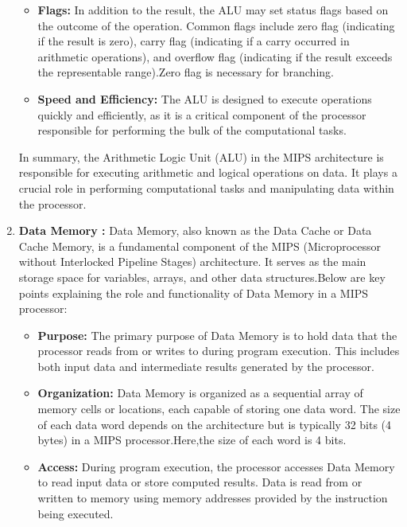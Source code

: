 \documentclass{article}
\begin{document}
\begin{enumerate}
\begin{itemize}
				\item \textbf{Flags:} In addition to the result, the ALU may set status flags based on the outcome of the operation. Common flags include zero flag (indicating if the result is zero), carry flag (indicating if a carry occurred in arithmetic operations), and overflow flag (indicating if the result exceeds the representable range).Zero flag is necessary for branching.
				
				\item \textbf{Speed and Efficiency:} The ALU is designed to execute operations quickly and efficiently, as it is a critical component of the processor responsible for performing the bulk of the computational tasks.
				
				
			\end{itemize}
			
			In summary, the Arithmetic Logic Unit (ALU) in the MIPS architecture is responsible for executing arithmetic and logical operations on data. It plays a crucial role in performing computational tasks and manipulating data within the processor.
			
			\item \textbf{Data Memory : }
			Data Memory, also known as the Data Cache or Data Cache Memory, is a fundamental component of the MIPS (Microprocessor without Interlocked Pipeline Stages) architecture.  It serves as the main storage space for variables, arrays, and other data structures.Below are key points explaining the role and functionality of Data Memory in a MIPS processor:
			
			\begin{itemize}
				
				
				
				\item \textbf{Purpose:} The primary purpose of Data Memory is to hold data that the processor reads from or writes to during program execution. This includes both input data and intermediate results generated by the processor.
				
				\item \textbf{Organization:} Data Memory is organized as a sequential array of memory cells or locations, each capable of storing one data word. The size of each data word depends on the architecture but is typically 32 bits (4 bytes) in a MIPS processor.Here,the size of each word is 4 bits.
				
				\item \textbf{Access:} During program execution, the processor accesses Data Memory to read input data or store computed results. Data is read from or written to memory using memory addresses provided by the instruction being executed.
				

\end{itemize}
\end{enumerate}
\end{document}

